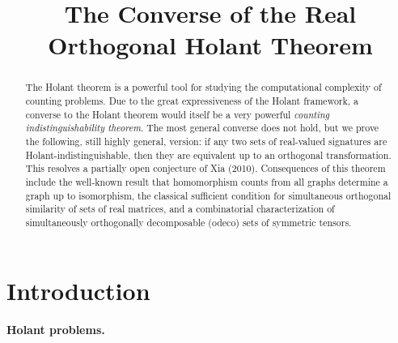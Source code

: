 \documentclass{theoretics}
\title{The Converse of the Real Orthogonal Holant Theorem}
\begin{document}
\maketitle

\begin{abstract}
The Holant theorem is a powerful tool for studying the computational complexity of
counting problems. Due to the great expressiveness of the Holant framework,
a converse to the Holant theorem would itself be a very powerful 
\emph{counting indistinguishability theorem}. The most general converse does not hold, but we prove
the following, still highly general, version:
if any two sets of real-valued signatures are Holant-indistinguishable, then they are equivalent 
up to an orthogonal transformation. This resolves a partially open conjecture of Xia (2010).
Consequences of this theorem include the well-known result that homomorphism counts from all graphs
determine a graph up to isomorphism, the classical sufficient condition for simultaneous orthogonal
similarity of sets of real matrices,
and a combinatorial characterization of simultaneously orthogonally decomposable (odeco) sets of 
symmetric tensors.
\end{abstract}


\section{Introduction}
\paragraph{Holant problems.}
\end{document}
